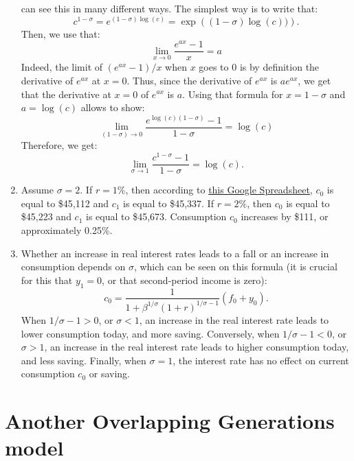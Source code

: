 \documentclass[]{book}
\theoremstyle{definition}
\theoremstyle{definition}
\theoremstyle{definition}
\theoremstyle{remark}
\begin{document}
\begin{enumerate}
  can see this in many different ways. The simplest way is to write
  that:
  \[c^{1-\sigma}=e^{(1-\sigma)\log(c)}=\exp\left((1-\sigma)\log(c))\right).\]
  Then, we use that: \[\lim_{x \to 0} \frac{e^{ax}-1}{x}=a\] Indeed, the
  limit of \((e^{ax}-1)/x\) when \(x\) goes to \(0\) is by definition
  the derivative of \(e^{ax}\) at \(x=0\). Thus, since the derivative of
  \(e^{ax}\) is \(ae^{ax}\), we get that the derivative at \(x=0\) of
  \(e^{ax}\) is \(a\). Using that formula for \(x = 1-\sigma\) and
  \(a=\log(c)\) allows to show:
  \[\lim_{(1-\sigma) \to 0} \frac{e^{\log(c)(1-\sigma)}-1}{1-\sigma}=\log(c)\]
  Therefore, we get:
  \[\lim_{\sigma \to 1} \frac{c^{1-\sigma}-1}{1-\sigma}=\log(c).\]
\item
  Assume \(\sigma = 2\). If \(r = 1\%\), then according to
  \href{https://docs.google.com/spreadsheets/d/1dDFa5YZE5170Tv36klHQ19ykK2bP9wjeR0Y1_h-kacg/edit?usp=sharing}{this
  Google Spreadsheet}, \(c_0\) is equal to \$45,112 and \(c_1\) is equal
  to \$45,337. If \(r = 2\%\), then \(c_0\) is equal to \$45,223 and
  \(c_1\) is equal to \$45,673. Consumption \(c_0\) increases by \$111,
  or approximately 0.25\%.
\item
  Whether an increase in real interest rates leads to a fall or an
  increase in consumption depends on \(\sigma\), which can be seen on
  this formula (it is crucial for this that \(y_1=0\), or that
  second-period income is zero):
  \[c_0 = \frac{1}{1 +\beta^{1/\sigma}(1+r)^{1/\sigma-1}} \left( f_0 + y_0\right).\]
  When \(1/\sigma-1>0\), or \(\sigma<1\), an increase in the real
  interest rate leads to lower consumption today, and more saving.
  Conversely, when \(1/\sigma-1<0\), or \(\sigma>1\), an increase in the
  real interest rate leads to higher consumption today, and less saving.
  Finally, when \(\sigma=1\), the interest rate has no effect on current
  consumption \(c_0\) or saving.
\end{enumerate}

\section{Another Overlapping Generations
model}\label{another-overlapping-generations-model-1}
\end{document}
